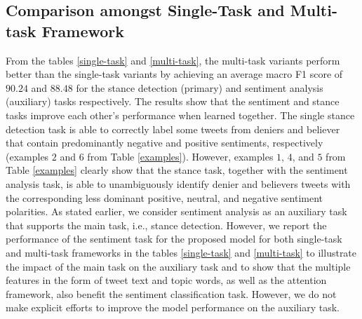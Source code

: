 \documentclass[letterpaper]{article} %
\begin{document}
\subsection{Comparison amongst Single-Task and Multi-task Framework}
\par \noindent From the tables \ref{single-task} and \ref{multi-task}, the multi-task variants perform better than the single-task variants by achieving an average macro F1 score of $90.24$ and $88.48$ for the stance detection (primary) and sentiment analysis (auxiliary) tasks respectively. The results show that the sentiment and stance tasks improve each other's performance when learned together. The single stance detection task is able to correctly label some tweets from deniers and believer that contain predominantly negative and positive sentiments, respectively (examples $2$ and $6$ from Table \ref{examples}). However, examples $1$, $4$, and $5$ from Table \ref{examples} clearly show that the stance task, together with the sentiment analysis task, is able to unambiguously identify denier and believers tweets with the corresponding less dominant positive, neutral, and negative sentiment polarities. As stated earlier, we consider sentiment analysis as an auxiliary task that supports the main task, i.e., stance detection. However, we report the performance of the sentiment task for the proposed model for both single-task and multi-task frameworks in the tables \ref{single-task} and \ref{multi-task} to illustrate the impact of the main task on the auxiliary task and to show that the multiple features in the form of tweet text and topic words, as well as the attention framework, also benefit the sentiment classification task. However, we do not make explicit efforts to improve the model performance on the auxiliary task.
\end{document}
